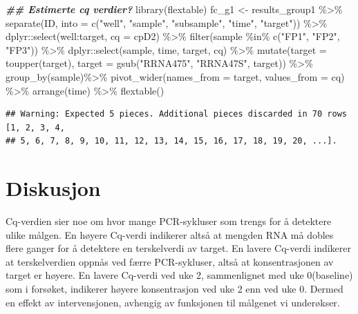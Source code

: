 \documentclass[
]{book}
\newenvironment{Shaded}{\begin{snugshade}}{\end{snugshade}}
\newcommand{\AttributeTok}[1]{\textcolor[rgb]{0.77,0.63,0.00}{#1}}
\newcommand{\DocumentationTok}[1]{\textcolor[rgb]{0.56,0.35,0.01}{\textbf{\textit{#1}}}}
\newcommand{\FunctionTok}[1]{\textcolor[rgb]{0.00,0.00,0.00}{#1}}
\newcommand{\NormalTok}[1]{#1}
\newcommand{\OtherTok}[1]{\textcolor[rgb]{0.56,0.35,0.01}{#1}}
\newcommand{\SpecialCharTok}[1]{\textcolor[rgb]{0.00,0.00,0.00}{#1}}
\newcommand{\StringTok}[1]{\textcolor[rgb]{0.31,0.60,0.02}{#1}}
\begin{document}
\begin{Shaded}
\begin{Highlighting}[]
\DocumentationTok{\#\# Estimerte cq verdier? }
\FunctionTok{library}\NormalTok{(flextable)}
\NormalTok{fc\_g1 }\OtherTok{\textless{}{-}}\NormalTok{ results\_group1 }\SpecialCharTok{\%\textgreater{}\%}
  \FunctionTok{separate}\NormalTok{(ID, }\AttributeTok{into =} \FunctionTok{c}\NormalTok{(}\StringTok{"well"}\NormalTok{, }\StringTok{"sample"}\NormalTok{, }\StringTok{"subsample"}\NormalTok{, }\StringTok{"time"}\NormalTok{, }\StringTok{"target"}\NormalTok{)) }\SpecialCharTok{\%\textgreater{}\%}
\NormalTok{  dplyr}\SpecialCharTok{::}\FunctionTok{select}\NormalTok{(well}\SpecialCharTok{:}\NormalTok{target, }\AttributeTok{cq =}\NormalTok{ cpD2) }\SpecialCharTok{\%\textgreater{}\%}
  \FunctionTok{filter}\NormalTok{(sample }\SpecialCharTok{\%in\%} \FunctionTok{c}\NormalTok{(}\StringTok{"FP1"}\NormalTok{, }\StringTok{"FP2"}\NormalTok{, }\StringTok{"FP3"}\NormalTok{)) }\SpecialCharTok{\%\textgreater{}\%}
\NormalTok{  dplyr}\SpecialCharTok{::}\FunctionTok{select}\NormalTok{(sample, time, target, cq) }\SpecialCharTok{\%\textgreater{}\%}
  \FunctionTok{mutate}\NormalTok{(}\AttributeTok{target =} \FunctionTok{toupper}\NormalTok{(target), }
         \AttributeTok{target =} \FunctionTok{gsub}\NormalTok{(}\StringTok{"RRNA475"}\NormalTok{, }\StringTok{"RRNA47S"}\NormalTok{, target)) }\SpecialCharTok{\%\textgreater{}\%}
  \FunctionTok{group\_by}\NormalTok{(sample)}\SpecialCharTok{\%\textgreater{}\%}
  \FunctionTok{pivot\_wider}\NormalTok{(}\AttributeTok{names\_from =}\NormalTok{ target, }\AttributeTok{values\_from =}\NormalTok{ cq) }\SpecialCharTok{\%\textgreater{}\%}
  \FunctionTok{arrange}\NormalTok{(time) }\SpecialCharTok{\%\textgreater{}\%}
   \FunctionTok{flextable}\NormalTok{()}
\end{Highlighting}
\end{Shaded}

\begin{verbatim}
## Warning: Expected 5 pieces. Additional pieces discarded in 70 rows [1, 2, 3, 4,
## 5, 6, 7, 8, 9, 10, 11, 12, 13, 14, 15, 16, 17, 18, 19, 20, ...].
\end{verbatim}

\hypertarget{diskusjon-1}{%
\section{Diskusjon}\label{diskusjon-1}}

Cq-verdien sier noe om hvor mange PCR-sykluser som trengs for å detektere ulike målgen\citep{kuang2018}. En høyere Cq-verdi indikerer altså at mengden RNA må dobles flere ganger for å detektere en terskelverdi av target. En lavere Cq-verdi indikerer at terskelverdien oppnås ved færre PCR-sykluser, altså at konsentrasjonen av target er høyere. En lavere Cq-verdi ved uke 2, sammenlignet med uke 0(baseline) som i forsøket, indikerer høyere konsentrasjon ved uke 2 enn ved uke 0. Dermed en effekt av intervensjonen, avhengig av funksjonen til målgenet vi underøkser.
\end{document}
